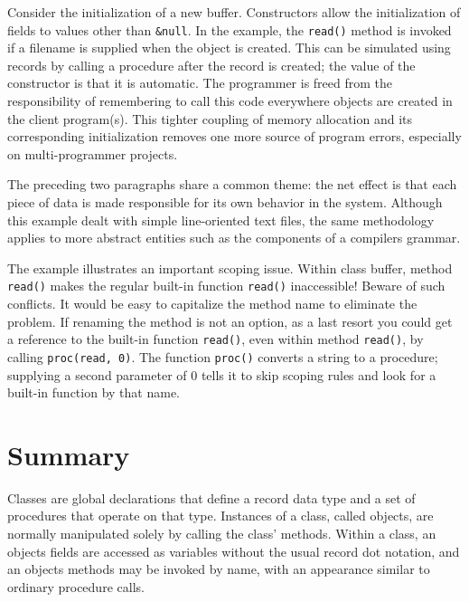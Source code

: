 Consider the initialization of a new buffer. Constructors allow the
initialization of fields to values other than \texttt{\&null}. In the
example, the \texttt{read()} method is invoked if a filename is
supplied when the object is created. This can be simulated using
records by calling a procedure after the record is created; the value
of the constructor is that it is automatic.
The programmer is freed from the responsibility of remembering to call
this code everywhere objects are created in the client program(s). This
tighter coupling of memory allocation and its
corresponding initialization removes one more source of program errors,
especially on multi-programmer projects. 

The preceding two paragraphs share a common theme:
the net effect is that each piece of data is made responsible for its
own behavior in the system. Although this example dealt with simple
line-oriented text files, the same methodology applies to more abstract
entities such as the components of a
compiler{\textquotesingle}s grammar.

The example illustrates an important scoping issue. Within class
buffer, method \texttt{read()} makes the regular built-in
function \texttt{read()} inaccessible! Beware of such
conflicts. It would be easy to capitalize the method name to
eliminate the problem. If renaming the method is not an option, as a
last resort you could get a reference to the built-in function
\texttt{read()}, even within method \texttt{read()}, by calling
\texttt{proc({\textquotedbl}read{\textquotedbl}, 0)}. The function
\texttt{proc()} converts a string to a procedure; supplying a second
parameter of 0 tells it to skip scoping rules and look for a built-in
function by that name.

\section*{Summary}

Classes are global declarations that define a record data type and a
set of procedures that operate on that type. Instances of a class,
called objects, are normally manipulated solely by calling
the class' methods. Within a class, an object{\textquotesingle}s
fields are accessed as variables without the usual record dot notation,
and an object{\textquotesingle}s methods may be invoked by name, with
an appearance similar to ordinary procedure calls.


\bigskip
